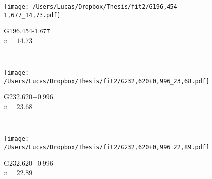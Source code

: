 \clearpage
\begin{figure*}[t]\ContinuedFloat
	\centering
	\begin{subfigure}[t]{0.3\textwidth}
		\texttt{[image: /Users/Lucas/Dropbox/Thesis/fit2/G196,454-1,677\_14,73.pdf]}
		\caption[]{G196.454-1.677\\$v=14.73$\,\kms}
	\end{subfigure}
	~
	\begin{subfigure}[t]{0.3\textwidth}
		\texttt{[image: /Users/Lucas/Dropbox/Thesis/fit2/G232,620+0,996\_23,68.pdf]}
		\caption[]{G232.620+0.996\\$v=23.68$\,\kms}
	\end{subfigure}
	~
	\begin{subfigure}[t]{0.3\textwidth}
		\texttt{[image: /Users/Lucas/Dropbox/Thesis/fit2/G232,620+0,996\_22,89.pdf]}
		\caption[]{G232.620+0.996\\$v=22.89$\,\kms}
	\end{subfigure}
	~
\end{figure*}
\clearpage
